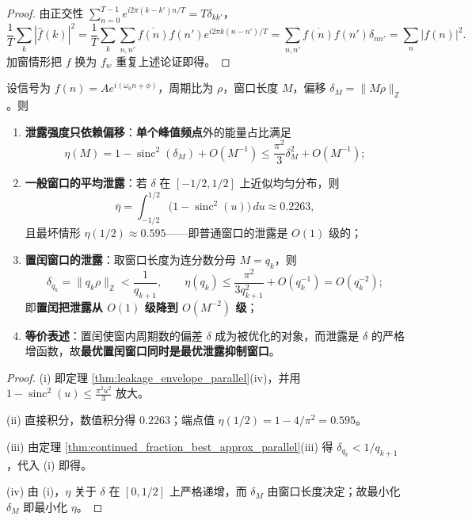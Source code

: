 \begin{proof}
由正交性 $\sum_{n=0}^{T-1}e^{i2\pi(k-k')n/T}=T\delta_{kk'}$，
\[
\frac1T\sum_k|\hat f(k)|^2=\frac1T\sum_k\sum_{n,n'}\overline{f(n)}f(n')e^{i2\pi k(n-n')/T}
=\sum_{n,n'}\overline{f(n)}f(n')\delta_{nn'}=\sum_n|f(n)|^2 .
\]
加窗情形把 $f$ 换为 $f_w$ 重复上述论证即得。
\end{proof}

\begin{theorem}[置闰抑制频谱泄露]\label{thm:intercalation_leakage_suppression}
设信号为 $f(n)=Ae^{i(\omega_0n+\phi)}$，周期比为 $\rho$，窗口长度 $M$，偏移 $\delta_M=\|M\rho\|_{\mathbb{Z}}$。则
\begin{enumerate}[label=(\roman*)]
    \item \textbf{泄露强度只依赖偏移}：\textbf{单个峰值频点}外的能量占比满足
    \[
    \eta(M)=1-\operatorname{sinc}^2(\delta_M)+O(M^{-1})\le\frac{\pi^2}{3}\delta_M^{2}+O(M^{-1});
    \]
    \item \textbf{一般窗口的平均泄露}：若 $\delta$ 在 $[-1/2,1/2]$ 上近似均匀分布，则
    \[
    \bar\eta=\int_{-1/2}^{1/2}\big(1-\operatorname{sinc}^2(u)\big)\,du\approx0.2263,
    \]
    且最坏情形 $\eta(1/2)\approx0.595$——即普通窗口的泄露是 $O(1)$ 级的；
    \item \textbf{置闰窗口的泄露}：取窗口长度为连分数分母 $M=q_k$，则
    \[
    \delta_{q_k}=\|q_k\rho\|_{\mathbb{Z}}<\frac{1}{q_{k+1}},\qquad
    \eta(q_k)\le\frac{\pi^2}{3q_{k+1}^{2}}+O(q_k^{-1})=O(q_k^{-2});
    \]
    即\textbf{置闰把泄露从 $O(1)$ 级降到 $O(M^{-2})$ 级}；
    \item \textbf{等价表述}：置闰使窗内周期数的偏差 $\delta$ 成为被优化的对象，而泄露是 $\delta$ 的严格增函数，故\textbf{最优置闰窗口同时是最优泄露抑制窗口}。
\end{enumerate}
\end{theorem}

\begin{proof}
(i) 即定理 \ref{thm:leakage_envelope_parallel}(iv)，并用 $1-\operatorname{sinc}^2(u)\le\frac{\pi^2u^2}{3}$ 放大。

(ii) 直接积分，数值积分得 $0.2263$；端点值 $\eta(1/2)=1-4/\pi^2=0.595$。

(iii) 由定理 \ref{thm:continued_fraction_best_approx_parallel}(iii) 得 $\delta_{q_k}<1/q_{k+1}$，代入 (i) 即得。

(iv) 由 (i)，$\eta$ 关于 $\delta$ 在 $[0,1/2]$ 上严格递增，而 $\delta_M$ 由窗口长度决定；故最小化 $\delta_M$ 即最小化 $\eta$。
\end{proof}

